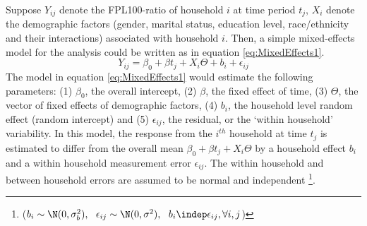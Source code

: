\documentclass[11pt]{extarticle} %
\begin{document}
Suppose $Y_{ij}$ denote the FPL100-ratio of household $i$ at time period $t_j$, $X_i$ denote the demographic factors (gender, marital status, education level, race/ethnicity and their interactions) associated with household $i$. Then, a simple mixed-effects model for the analysis could be written as in equation \ref{eq:MixedEffects1}. 
\vspace{-0.5cm}
\begin{equation}
Y_{ij} = \beta_0 + \beta t_j + X_i\Theta + b_i + \epsilon_{ij}
\label{eq:MixedEffects1}
\end{equation}
The model in equation \ref{eq:MixedEffects1} would estimate the following parameters: (1) $\beta_0$, the overall intercept, (2) $\beta$, the fixed effect of time, (3) $\Theta$, the vector of fixed effects of demographic factors, (4) $b_i$, the household level random effect (random intercept) and (5) $\epsilon_{ij}$, the residual, or the `within household' variability. %
In this model, the response from the $i^{th}$ household at time $t_j$ is estimated to differ from the overall mean $\beta_0 + \beta t_j + X_i\Theta$ by a household effect $b_i$ and a within household measurement error $\epsilon_{ij}$. The within household and between household errors are assumed to be normal and independent \footnote{($b_i \sim \N(0, \sigma^2_b),\ \ \epsilon_{ij} \sim \N(0, \sigma^2), \ \ b_i \indep \epsilon_{ij}, \forall i, j$)}.
\end{document}
